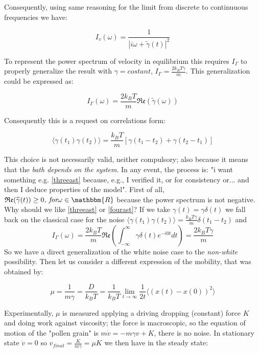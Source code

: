 \documentclass{article}
\begin{document}
Consequently, using  same reasoning for the limit from discrete to continuuous frequencies we have:

\begin{equation}
I_v(\omega) = \frac{1}{|i\omega+ \widetilde{\gamma}(t)|^2} \label{twoast}
\end{equation}

To represent the power spectrum of velocity in equilibrium this requires $I_{\Gamma}$ to properly generalize the result with $\gamma = \textit{costant}$, $I_{\Gamma}= \frac{2 k_B T \gamma}{m}$. This generalization could be expressed as:

\begin{equation}
I_{\Gamma}(\omega)= \frac{2 k_B T}{m} \mathfrak{Re} (\widetilde{\gamma}(\omega)) \label{threeast}
\end{equation}

Consequently this is a request on correlations form:

\begin{equation}
\langle \gamma(t_1) \gamma(t_2) \rangle = \frac{k_B T}{m}[ \gamma(t_1-t_2) + \gamma(t_2-t_1) ] \label{fourast} 
\end{equation}

This choice is not necessarily valid, neither compulsory; also because it means that the \textit{bath depends on the system}.
In any event, the process is: "i want something e.g. \ref{threeast} because, e.g., I verified it, or for consistency or... and then I deduce properties of the model". First of all, $ \mathfrak{Re} (\widetilde{\gamma}(t)) \geq 0 \textit{, for} \omega \in \mathbbm{R} $ because the power spectrum is not negative.
Why should we like \ref{threeast} or \ref{fourast}? If we take $\gamma(t) = \gamma \delta(t)$ we fall back on the classical case for the noise $ \langle \gamma(t_1) \gamma(t_2) \rangle = \frac{k_B T \gamma}{m} \delta (t_1-t_2)$ and $$ I_{\Gamma}(\omega)= \frac{2 k_B T}{m} \mathfrak{Re} (\int_{- \infty}^{ \infty} \gamma \delta(t) e^{-i 0 t} dt) = \frac{2 k_B T \gamma}{m} $$ So we have a direct generalization of the white noise case to the \emph{non-white} possibility. Then let us consider a different expression of the mobility, that was obtained by:

\begin{equation}
\mu = \frac{1}{m \gamma} = \frac{D}{k_B T} = \frac{1}{k_B T} \lim \limits_{t \to \infty} \frac{1}{2t} \langle (x(t)-x(0))^2 \rangle
\end{equation}

Experimentally, $\mu$ is measured applying a driving dropping (constant) force $K$ and doing work against viscosity; the force is macroscopic, so the equation of motion of the "pollen grain" is $m\dot{v} = -m \gamma v + K $, there is no noise. In stationary state $\dot{v}=0$ so $v_{final} = \frac{K}{m \gamma} = \mu K$ we then have in the steady state:
\end{document}
